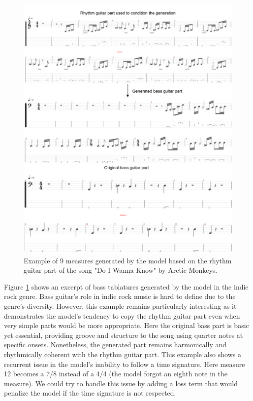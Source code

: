 \begin{figure}[!ht]
    \centering
    \includegraphics[width=0.85\linewidth]{../images-figures/gen_arctic_monkeys.png}
    \caption{Example of 9 measures generated by the model based on the rhythm guitar part of the song "Do I Wanna Know" by Arctic Monkeys.}
    \label{fig:gen_arctic_monkeys}
\end{figure}

Figure \ref{fig:gen_arctic_monkeys} shows an excerpt of bass tablatures generated by the model in the indie rock genre.
Bass guitar's role in indie rock music is hard to define due to the genre's diversity.
However, this example remains particularly interesting as it demonstrates the model's tendency to copy the rhythm guitar part even when very simple parts would be more appropriate.
Here the original bass part is basic yet essential, providing groove and structure to the song using quarter notes at specific onsets.
Nonetheless, the generated part remains harmonically and rhythmically coherent with the rhythm guitar part.
This example also shows a recurrent issue in the model's inability to follow a time signature.
Here measure 12 becomes a 7/8 instead of a 4/4 (the model forgot an eighth note in the measure).
We could try to handle this issue by adding a loss term that would penalize the model if the time signature is not respected.

